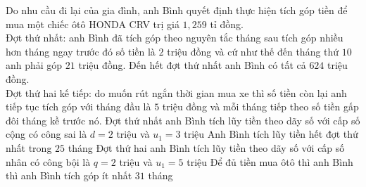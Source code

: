 \begin{ex}%
	Do nhu cầu đi lại của gia đình, anh Bình  quyết định thực hiện tích góp tiền để mua một chiếc ôtô HONDA CRV trị giá $1{,}259$ tỉ đồng.\\
	Đợt thứ nhất: anh Bình đã tích góp theo nguyên tắc tháng sau tích góp nhiều hơn tháng ngay trước đó số tiền là $2$ triệu đồng và cứ như thế đến tháng thứ $10$ anh phải góp  $21$ triệu đồng. Đến hết đợt thứ nhất anh Bình có tất cả $624$ triệu đồng.\\
	Đợt thứ hai kế tiếp: do muốn rút ngắn thời gian mua xe  thì số tiền còn lại anh tiếp tục tích góp với tháng đầu là $5$ triệu đồng và mỗi tháng tiếp theo số tiền gấp đôi tháng kề trước nó.
	 \choiceTF
		{\True Đợt thứ nhất anh Bình tích lũy tiền theo  dãy số với cấp số cộng có công sai là $d=2$ triệu và $u_1=3$ triệu}
		{Anh Bình tích lũy tiền hết  đợt thứ nhất trong $25$ tháng}
		{\True Đợt thứ hai anh Bình tích lũy  tiền theo dãy số với cấp số nhân có công bội là $q=2$ triệu và $u_1=5$ triệu}
		 {\True Để đủ tiền mua ôtô thì anh Bình thì anh Bình tích góp ít nhất $31$ tháng}
\end{ex}

